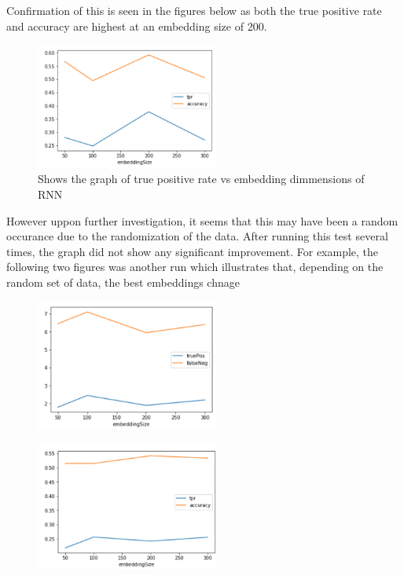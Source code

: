 \documentclass[twoside,twocolumn]{article}
\begin{document}
Confirmation of this is seen in the figures below as both the true positive rate and accuracy
are highest at an embedding size of 200.

\begin{figure}[H]
\includegraphics[width=6cm]{rnn_embeddSize_test_tpr-graph}
\caption{Shows the graph of true positive rate vs embedding dimmensions of RNN}
\centering
\end{figure}


However uppon further investigation, it seems that this may have been a random occurance due to the
randomization of the data. After running this test several times, the graph did not show any significant
improvement. For example, the following two figures was another run which illustrates that, depending
on the random set of data, the best embeddings  chnage

\begin{figure}[H]
\includegraphics[width=6cm]{rnn_embeddSize_test_graph1}
\centering
\end{figure}


\begin{figure}[H]
\includegraphics[width=6cm]{rnn_embeddSize_test_tpr-graph1}
\centering
\end{figure}
\end{document}

